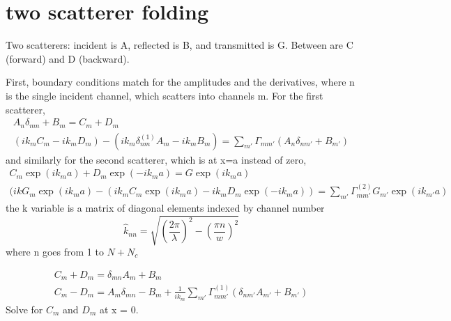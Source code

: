 \section{two scatterer folding}

Two scatterers: incident is A, reflected is B, and transmitted is G. Between are C (forward) and D (backward).

First, boundary conditions match for the amplitudes and the derivatives, where n is the single incident channel, which scatters into channels m. For the first scatterer,
\begin{equation}
\begin{gathered}
A_n \delta_{mn} + B_m = C_m+D_m \\
(i k_m C_m-i k_m D_m) - (i k_m \delta_{nm}^{(1)} A_m-i k_m B_m) = 
\sum_{m'} \Gamma_{mm'} (A_n \delta_{nm'}+B_{m'})
\end{gathered}
\end{equation}
and similarly for the second scatterer, which is at x=a instead of zero,
\begin{equation}
\begin{gathered}
C_m \exp(i k_m a) + D_m \exp(-i k_m a) = G \exp(i k_m a) \\
(i k G_m \exp(i k_m a)-(i k_m C_m \exp(i k_m a) - i k_m D_m \exp(-i k_m a)) = 
\sum_{m'} \Gamma_{mm'}^{(2)} G_{m'} \exp(i k_{m'} a)
\label{matchatxequalsa}
\end{gathered}
\end{equation}
the k variable is a matrix of diagonal elements indexed by channel number
\begin{equation}
\hat{k}_{nn} = \sqrt{(\frac{2 \pi}{\lambda})^2 -(\frac{\pi n}{w})^2}
\end{equation}
where n goes from 1 to $N+N_c$

\begin{equation}
\begin{gathered}
C_m +D_m = \delta_{mn} A_m+B_m \\
C_m -D_m = A_m \delta_{mn} - B_m +\frac{1}{i k_m} \sum_{m'} 
\Gamma_{mm'}^{(1)} (\delta_{nm'} A_{m'}+B_{m'})
\end{gathered}
\end{equation}
Solve for $C_m$ and $D_m$ at x = 0.
\begin{comment}
use
x+y=A
x-y=B
==>  2x = A+B
====> x = (A+B)/2
repeat for y
\end{comment}

